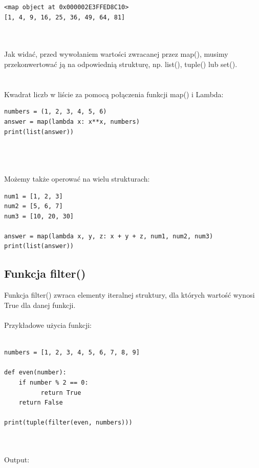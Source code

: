 \documentclass[a4paper, 12pt]{article}
\begin{document}
\noindent\begin{minipage}{\linewidth}
\begin{lstlisting}[style=python]
<map object at 0x000002E3FFED8C10>
[1, 4, 9, 16, 25, 36, 49, 64, 81]
\end{lstlisting}
\end{minipage}
\\ \\
Jak widać, przed wywołaniem wartości zwracanej przez map(), musimy przekonwertować ją na odpowiednią strukturę, np. list(), tuple() lub set().
\\ \\ \\
Kwadrat liczb w liście za pomocą połączenia funkcji map() i Lambda:

\noindent\begin{minipage}{\linewidth}
\begin{lstlisting}[style=python]
numbers = (1, 2, 3, 4, 5, 6)
answer = map(lambda x: x**x, numbers)
print(list(answer))
\end{lstlisting}
\end{minipage}
\\ \\ \\
Możemy także operować na wielu strukturach:

\noindent\begin{minipage}{\linewidth}
\begin{lstlisting}[style=python]
num1 = [1, 2, 3]
num2 = [5, 6, 7]
num3 = [10, 20, 30]

answer = map(lambda x, y, z: x + y + z, num1, num2, num3)
print(list(answer))
\end{lstlisting}
\end{minipage}

\pagebreak

\subsection{Funkcja filter()}
Funkcja filter() zwraca elementy iteralnej struktury, dla których wartość wynosi True dla danej funkcji.
\\ \\
Przykładowe użycia funkcji:
\\ \\
\noindent\begin{minipage}{\linewidth}
\begin{lstlisting}[style=python]
numbers = [1, 2, 3, 4, 5, 6, 7, 8, 9]

def even(number):
    if number % 2 == 0:
          return True
    return False

print(tuple(filter(even, numbers)))
\end{lstlisting}
\end{minipage}
\\ \\ 
Output:
\end{document}
